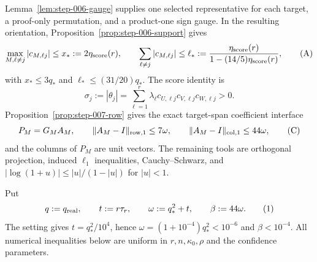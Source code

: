 Lemma~\ref{lem:step-006-gauge} supplies one selected representative for each
target, a proof-only permutation, and a product-one sign gauge. In the
resulting orientation, Proposition~\ref{prop:step-006-support} gives
\[
\max_{M,\ell\ne j}|c_{M,\ell j}|\le
x_*:=2\eta_{\rm score}(r),\qquad
\sum_{\ell\ne j}|c_{M,\ell j}|\le
\ell_*:=\frac{\eta_{\rm score}(r)}
{1-(14/5)\eta_{\rm score}(r)},
\tag{A}
\]
with $x_*\le3q_*$ and $\ell_*\le(31/20)q_*$. The score identity is
\[
\sigma_j:=|\theta_j|
=\sum_{\ell=1}^r\lambda_\ell
c_{U,\ell j}c_{V,\ell j}c_{W,\ell j}>0.
\tag{B}
\]
Proposition~\ref{prop:step-007-row} gives the exact target-span coefficient
interface
\[
P_M=G_MA_M,\qquad
\|A_M-I\|_{\rm row,1}\le7\omega,\qquad
\|A_M-I\|_{\rm col,1}\le44\omega,
\tag{C}
\]
and the columns of $P_M$ are unit vectors. The remaining tools are orthogonal
projection, induced $\ell_1$ inequalities, Cauchy--Schwarz, and
$|\log(1+u)|\le |u|/(1-|u|)$ for $|u|<1$.

Put
\[
 q:=q_{\rm real},\qquad t:=r\tau_r,\qquad
 \omega:=q_*^2+t,\qquad \beta:=44\omega. \tag{1}
\]
The setting gives $t=q_*^2/10^4$, hence
$\omega=(1+10^{-4})q_*^2<10^{-6}$ and $\beta<10^{-4}$. All numerical
inequalities below are uniform in $r,n,\kappa_0,\rho$ and the confidence
parameters.


